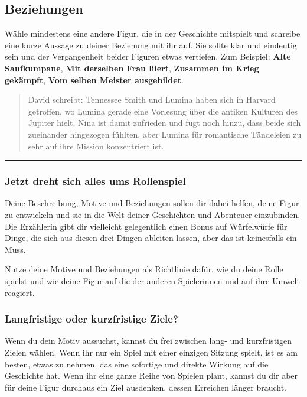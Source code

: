 \documentclass[]{article}
\begin{document}
\subsection{Beziehungen}\label{beziehungen}

Wähle mindestens eine andere Figur, die in der Geschichte mitspielt und
schreibe eine kurze Aussage zu deiner Beziehung mit ihr auf. Sie sollte
klar und eindeutig sein und der Vergangenheit beider Figuren etwas
vertiefen. Zum Beispiel: \textbf{Alte Saufkumpane}, \textbf{Mit
derselben Frau liiert}, \textbf{Zusammen im Krieg gekämpft}, \textbf{Vom
selben Meister ausgebildet}.

\begin{quote}
David schreibt: Tennessee Smith und Lumina haben sich in Harvard
getroffen, wo Lumina gerade eine Vorlesung über die antiken Kulturen des
Jupiter hielt. Nina ist damit zufrieden und fügt noch hinzu, dass beide
sich zueinander hingezogen fühlten, aber Lumina für romantische
Tändeleien zu sehr auf ihre Mission konzentriert ist.
\end{quote}

\begin{center}\rule{0.5\linewidth}{\linethickness}\end{center}

\columnsbegin

\subsubsection{Jetzt dreht sich alles ums
Rollenspiel}\label{jetzt-dreht-sich-alles-ums-rollenspiel}

Deine Beschreibung, Motive und Beziehungen sollen dir dabei helfen,
deine Figur zu entwickeln und sie in die Welt deiner Geschichten und
Abenteuer einzubinden. Die Erzählerin gibt dir vielleicht gelegentlich
einen Bonus auf Würfelwürfe für Dinge, die sich aus diesen drei Dingen
ableiten lassen, aber das ist keinesfalls ein Muss.

Nutze deine Motive und Beziehungen als Richtlinie dafür, wie du deine
Rolle spielst und wie deine Figur auf die der anderen Spielerinnen und
auf ihre Umwelt reagiert.

\subsubsection{Langfristige oder kurzfristige
Ziele?}\label{langfristige-oder-kurzfristige-ziele}

Wenn du dein Motiv aussuchst, kannst du frei zwischen lang- und
kurzfristigen Zielen wählen. Wenn ihr nur ein Spiel mit einer einzigen
Sitzung spielt, ist es am besten, etwas zu nehmen, das eine sofortige
und direkte Wirkung auf die Geschichte hat. Wenn ihr eine ganze Reihe
von Spielen plant, kannst du dir aber für deine Figur durchaus ein Ziel
ausdenken, dessen Erreichen länger braucht.
\end{document}
